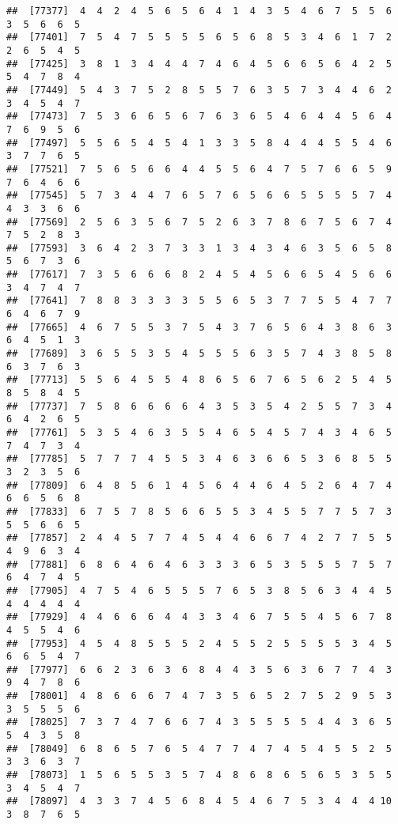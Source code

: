 \documentclass[
]{book}
\begin{document}
\begin{verbatim}
##  [77377]  4  4  2  4  5  6  5  6  4  1  4  3  5  4  6  7  5  5  6  3  5  6  6  5
##  [77401]  7  5  4  7  5  5  5  5  6  5  6  8  5  3  4  6  1  7  2  2  6  5  4  5
##  [77425]  3  8  1  3  4  4  4  7  4  6  4  5  6  6  5  6  4  2  5  5  4  7  8  4
##  [77449]  5  4  3  7  5  2  8  5  5  7  6  3  5  7  3  4  4  6  2  3  4  5  4  7
##  [77473]  7  5  3  6  6  5  6  7  6  3  6  5  4  6  4  4  5  6  4  7  6  9  5  6
##  [77497]  5  5  6  5  4  5  4  1  3  3  5  8  4  4  4  5  5  4  6  3  7  7  6  5
##  [77521]  7  5  6  5  6  6  4  4  5  5  6  4  7  5  7  6  6  5  9  7  6  4  6  6
##  [77545]  5  7  3  4  4  7  6  5  7  6  5  6  6  5  5  5  5  7  4  4  3  3  6  6
##  [77569]  2  5  6  3  5  6  7  5  2  6  3  7  8  6  7  5  6  7  4  7  5  2  8  3
##  [77593]  3  6  4  2  3  7  3  3  1  3  4  3  4  6  3  5  6  5  8  5  6  7  3  6
##  [77617]  7  3  5  6  6  6  8  2  4  5  4  5  6  6  5  4  5  6  6  3  4  7  4  7
##  [77641]  7  8  8  3  3  3  3  5  5  6  5  3  7  7  5  5  4  7  7  6  4  6  7  9
##  [77665]  4  6  7  5  5  3  7  5  4  3  7  6  5  6  4  3  8  6  3  6  4  5  1  3
##  [77689]  3  6  5  5  3  5  4  5  5  5  6  3  5  7  4  3  8  5  8  6  3  7  6  3
##  [77713]  5  5  6  4  5  5  4  8  6  5  6  7  6  5  6  2  5  4  5  8  5  8  4  5
##  [77737]  7  5  8  6  6  6  6  4  3  5  3  5  4  2  5  5  7  3  4  6  4  2  6  5
##  [77761]  5  3  5  4  6  3  5  5  4  6  5  4  5  7  4  3  4  6  5  7  4  7  3  4
##  [77785]  5  7  7  7  4  5  5  3  4  6  3  6  6  5  3  6  8  5  5  3  2  3  5  6
##  [77809]  6  4  8  5  6  1  4  5  6  4  4  6  4  5  2  6  4  7  4  6  6  5  6  8
##  [77833]  6  7  5  7  8  5  6  6  5  5  3  4  5  5  7  7  5  7  3  5  5  6  6  5
##  [77857]  2  4  4  5  7  7  4  5  4  4  6  6  7  4  2  7  7  5  5  4  9  6  3  4
##  [77881]  6  8  6  4  6  4  6  3  3  3  6  5  3  5  5  5  7  5  7  6  4  7  4  5
##  [77905]  4  7  5  4  6  5  5  5  7  6  5  3  8  5  6  3  4  4  5  4  4  4  4  4
##  [77929]  4  4  6  6  6  4  4  3  3  4  6  7  5  5  4  5  6  7  8  4  5  5  4  6
##  [77953]  4  5  4  8  5  5  5  2  4  5  5  2  5  5  5  5  3  4  5  6  6  5  4  7
##  [77977]  6  6  2  3  6  3  6  8  4  4  3  5  6  3  6  7  7  4  3  9  4  7  8  6
##  [78001]  4  8  6  6  6  7  4  7  3  5  6  5  2  7  5  2  9  5  3  3  5  5  5  6
##  [78025]  7  3  7  4  7  6  6  7  4  3  5  5  5  5  4  4  3  6  5  5  4  3  5  8
##  [78049]  6  8  6  5  7  6  5  4  7  7  4  7  4  5  4  5  5  2  5  3  3  6  3  7
##  [78073]  1  5  6  5  5  3  5  7  4  8  6  8  6  5  6  5  3  5  5  3  4  5  4  7
##  [78097]  4  3  3  7  4  5  6  8  4  5  4  6  7  5  3  4  4  4 10  3  8  7  6  5

\end{verbatim}
\end{document}
